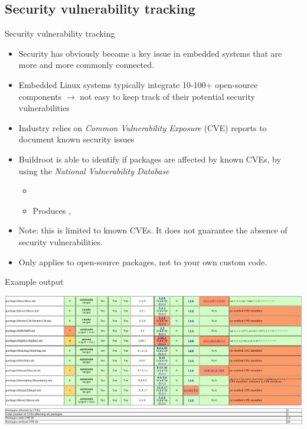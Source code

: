 \subsection{Security vulnerability tracking}

\begin{frame}{Security vulnerability tracking}
  \begin{itemize}
  \item Security has obviously become a key issue in embedded systems
    that are more and more commonly connected.
  \item Embedded Linux systems typically integrate 10-100+ open-source
    components $\rightarrow$ not easy to keep track of their potential
    security vulnerabilities
  \item Industry relies on {\em Common Vulnerability Exposure} (CVE)
    reports to document known security issues
  \item Buildroot is able to identify if packages are affected by
    known CVEs, by using the {\em National Vulnerability Database}
    \begin{itemize}
    \item {}
    \item Produces , 
    \end{itemize}
  \item Note: this is limited to known CVEs. It does not guarantee the
    absence of security vulnerabilities.
  \item Only applies to open-source packages, not to your own custom
    code.
  \end{itemize}
\end{frame}

\begin{frame}{Example  output}
  \begin{center}
    \includegraphics[width=\textwidth]{slides/buildroot-advanced-packages/pkg-stats-output.png}
    \includegraphics[width=\textwidth]{slides/buildroot-advanced-packages/pkg-stats-output-summary.png}
  \end{center}
\end{frame}

